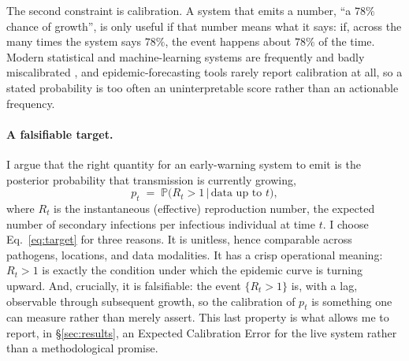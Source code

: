 \documentclass[10pt,twocolumn]{article}
\theoremstyle{definition}
\newcommand{\Rt}{R_t}
\newcommand{\Prob}{\mathbb{P}}
\begin{document}
The second constraint is calibration. A system that emits a number, ``a
$78\%$ chance of growth'', is only useful if that number means what it says: if,
across the many times the system says $78\%$, the event happens about $78\%$ of
the time. Modern statistical and machine-learning systems are frequently and
badly miscalibrated \citep{guo2017}, and epidemic-forecasting tools rarely report
calibration at all, so a stated probability is too often an uninterpretable
score rather than an actionable frequency.

\paragraph{A falsifiable target.}
I argue that the right quantity for an early-warning system to emit is the
posterior probability that transmission is currently growing,
\begin{equation}
p_t \;=\; \Prob\!\big(\Rt > 1 \,\big|\, \text{data up to } t\big),
\label{eq:target}
\end{equation}
where $\Rt$ is the instantaneous (effective) reproduction number, the expected
number of secondary infections per infectious individual at time $t$. I choose
Eq.~\eqref{eq:target} for three reasons. It is unitless, hence comparable
across pathogens, locations, and data modalities. It has a crisp
operational meaning: $\Rt>1$ is exactly the condition under which the
epidemic curve is turning upward. And, crucially, it is falsifiable: the
event $\{\Rt>1\}$ is, with a lag, observable through subsequent growth, so the
calibration of $p_t$ is something one can measure rather than merely
assert. This last property is what allows me to report, in
\S\ref{sec:results}, an Expected Calibration Error for the live system rather
than a methodological promise.
\end{document}
